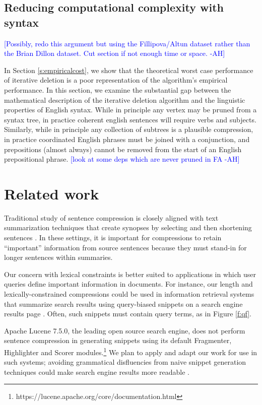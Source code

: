 \documentclass[11pt,a4paper]{article}
\newcommand{\ahcomment}[1]{\textcolor{blue}{[#1 -AH]}}
\begin{document}
\subsection{Reducing computational complexity with syntax}

\ahcomment{Possibly, redo this argument but using the Fillipova/Altun dataset rather than the Brian Dillon dataset. Cut section if not enough time or space.}

In Section \ref{s:empiricalcost}, we show that the theoretical worst case performance of iterative deletion is a poor representation of the algorithm's empirical performance. In this section, we examine the substantial gap between the mathematical description of the iterative deletion algorithm and the linguistic properties of English syntax. While in principle any vertex may be pruned from a syntax tree, in practice coherent english sentences will require verbs and subjects. Similarly, while in principle any collection of subtrees is a plausible compression, in practice coordinated English phrases must be joined with a conjunction, and prepositions (almost always) cannot be removed from the start of an English prepositional phrase. \ahcomment{look at some deps which are never pruned in FA}

\section{Related work}

Traditional study of sentence compression is closely aligned with text summarization techniques that create synopses by selecting and then shortening sentences \cite{Knight2000StatisticsBasedS,vanderwende2007beyond,clarke2008global,martins2009summarization,Nenkova2012ASO}. 
In these settings, it is important for compressions to retain ``important'' information from source sentences because they must stand-in for longer sentences within summaries.

Our concern with lexical constraints is better suited to applications in which user queries define important information in documents. For instance, our length and lexically-constrained compressions could be used in information retrieval systems that summarize search results using query-biased snippets on a search engine results page \cite{tombros1998advantages,Metzler2008MachineLS}. Often, such snippets must contain query terms, as in Figure \ref{f:qf}. 

Apache Lucene 7.5.0, the leading open source search engine, does not perform sentence compression in generating snippets using its default Fragmenter, Highlighter and Scorer modules.\footnote{https://lucene.apache.org/core/documentation.html} We plan to apply and adapt our work for use in such systems; avoiding grammatical disfluencies from naive snippet generation techniques could make search engine results more readable \cite{kanungo2009predicting}.
\end{document}
